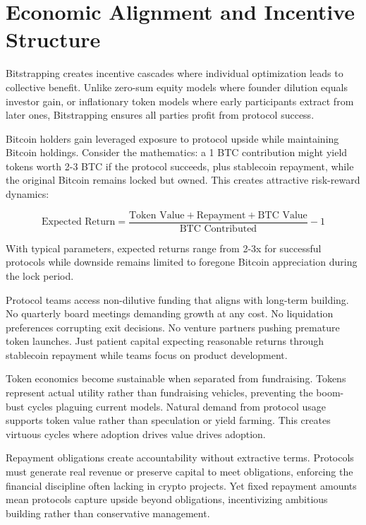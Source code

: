 \section{Economic Alignment and Incentive Structure}

Bitstrapping creates incentive cascades where individual optimization leads to collective benefit. Unlike zero-sum equity models where founder dilution equals investor gain, or inflationary token models where early participants extract from later ones, Bitstrapping ensures all parties profit from protocol success.

Bitcoin holders gain leveraged exposure to protocol upside while maintaining Bitcoin holdings. Consider the mathematics: a 1 BTC contribution might yield tokens worth 2-3 BTC if the protocol succeeds, plus stablecoin repayment, while the original Bitcoin remains locked but owned. This creates attractive risk-reward dynamics:

\[
\text{Expected Return} = \frac{\text{Token Value} + \text{Repayment} + \text{BTC Value}}{\text{BTC Contributed}} - 1
\]

With typical parameters, expected returns range from 2-3x for successful protocols while downside remains limited to foregone Bitcoin appreciation during the lock period.

Protocol teams access non-dilutive funding that aligns with long-term building. No quarterly board meetings demanding growth at any cost. No liquidation preferences corrupting exit decisions. No venture partners pushing premature token launches. Just patient capital expecting reasonable returns through stablecoin repayment while teams focus on product development.

Token economics become sustainable when separated from fundraising. Tokens represent actual utility rather than fundraising vehicles, preventing the boom-bust cycles plaguing current models. Natural demand from protocol usage supports token value rather than speculation or yield farming. This creates virtuous cycles where adoption drives value drives adoption.

Repayment obligations create accountability without extractive terms. Protocols must generate real revenue or preserve capital to meet obligations, enforcing the financial discipline often lacking in crypto projects. Yet fixed repayment amounts mean protocols capture upside beyond obligations, incentivizing ambitious building rather than conservative management.

